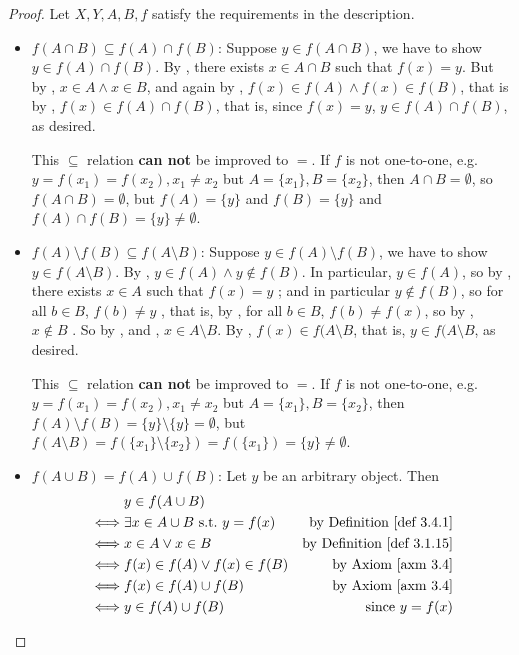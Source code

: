 \begin{proof} Let \(X, Y, A, B, f\) satisfy the requirements in the description.

\begin{itemize}
    \item \(f(A \cap B) \subseteq f(A) \cap f(B)\):
        Suppose \(y \in f(A \cap B)\), we have to show \(y \in f(A) \cap f(B)\).
        By , there exists \(x \in A \cap B\) such that \(f(x) = y\).
        But by , \(x \in A \land x \in B\),
        and again by , \(f(x) \in f(A) \land f(x) \in f(B)\), that is by , \(f(x) \in f(A) \cap f(B)\),
        that is, since \(f(x) = y\), \(y \in f(A) \cap f(B)\), as desired.
        
        This \(\subseteq\) relation \textbf{can not} be improved to \(=\).
        If \(f\) is not one-to-one, e.g. \(y = f(x_1) = f(x_2), x_1 \neq x_2\) but \(A = \{ x_1 \}, B = \{ x_2 \}\),
        then \(A \cap B = \emptyset\), so \(f(A \cap B) = \emptyset\),
        but \(f(A) = \{ y \}\) and \(f(B) = \{ y \}\) and \(f(A) \cap f(B) = \{ y \} \neq \emptyset\).
    \item \(f(A) \setminus f(B) \subseteq f(A \setminus B)\): 
        Suppose \(y \in f(A) \setminus f(B)\), we have to show \(y \in f(A \setminus B)\).
        By , \(y \in f(A) \land y \notin f(B)\).
        In particular, \(y \in f(A)\), so by , there exists \(x \in A\)  such that \(f(x) = y\) ;
        and in particular \(y \notin f(B)\), so for all \(b \in B\), \(f(b) \neq y\) ,
        that is, by , for all \(b \in B\), \(f(b) \neq f(x)\), so by , \(x \notin B\) .
        So by , and , \(x \in A \setminus B\).
        By , \(f(x) \in f(A \setminus B\), that is, \(y \in f(A \setminus B\), as desired.
        
        This \(\subseteq\) relation \textbf{can not} be improved to \(=\).
        If \(f\) is not one-to-one, e.g. \(y = f(x_1) = f(x_2), x_1 \neq x_2\) but \(A = \{ x_1 \}, B = \{ x_2 \}\),
        then \(f(A) \setminus f(B) = \{ y \} \setminus \{ y \} = \emptyset\),
        but \(f(A \setminus B) = f( \{ x_1 \} \setminus \{ x_2 \} ) = f( \{ x_1 \}) = \{ y \} \neq \emptyset\).
    \item \(f(A \cup B) = f(A) \cup f(B)\): Let \(y\) be an arbitrary object. Then
        \begin{align*}
                 & y \in f(A \cup B) \\
            \iff & \exists x \in A \cup B \text{\ s.t.\ } y = f(x) & \text{by \DEF{3.4.1}} \\
            \iff & x \in A \lor x \in B & \text{by \DEF{3.1.15}} \\
            \iff & f(x) \in f(A) \lor f(x) \in f(B) & \text{by \AXM{3.4}} \\
            \iff & f(x) \in f(A) \cup f(B) & \text{by \AXM{3.4}} \\
            \iff & y \in f(A) \cup f(B) & \text{since \(y = f(x)\)}
        \end{align*}
\end{itemize}
\end{proof}

